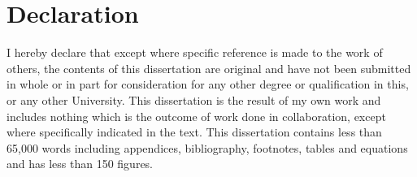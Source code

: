 \chapter*{Declaration}


I hereby declare that except where specific reference is made to the work of others,
the contents of this dissertation are original and have not been submitted in whole
or in part for consideration for any other degree or qualification in this,
or any other University. This dissertation is the result of my own work
and includes nothing which is the outcome of work done in collaboration,
except where specifically indicated in the text.
This dissertation contains less than 65,000 words including
appendices, bibliography, footnotes, tables and equations and has
less than 150 figures.
